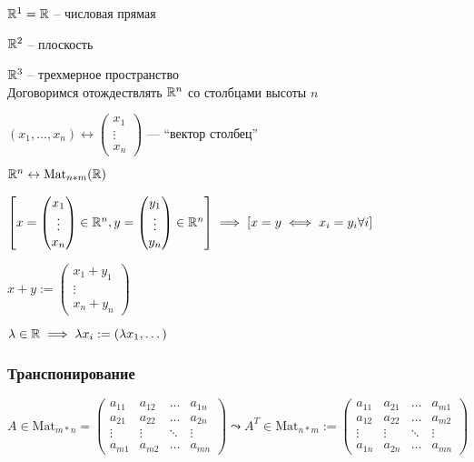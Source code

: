 \( \mathbb{R}^1 = \mathbb{R} \) \quad -- числовая прямая

\( \mathbb{R}^2 \) \quad -- плоскость

\( \mathbb{R}^3 \) \quad -- трехмерное пространство \\

Договоримся отождествлять \( \mathbb{R}^n \) со столбцами высоты \( n \)

\( (x_1, \dots, x_n) \leftrightarrow \left( \begin{smallmatrix}
	x_1 \\ \vdots \\ x_n
\end{smallmatrix} \right) \text{ --- ``вектор столбец''} \)

\( \mathbb{R}^n \leftrightarrow \text{Mat}_{n * m}(\mathbb{R}) \)

\( \left[ x = \begin{pmatrix}
	x_1 \\ \vdots \\ x_n
\end{pmatrix} \in \mathbb{R}^n, y = \begin{pmatrix}
	y_1 \\ \vdots \\ y_n
\end{pmatrix} \in \mathbb{R}^n \right] \implies \left[ x = y \iff x_i = y_i \forall i \right] \)

\( x + y := \begin{pmatrix}
	x_1 + y_1 \\ \vdots \\ x_n + y_n
\end{pmatrix} \)

\( \lambda \in \mathbb{R} \implies \lambda x_i := (\lambda x_1, \dots) \)

\subsubsection{Транспонирование}

\( A \in \text{Mat}_{m*n} = \begin{pmatrix}
	a_{11} & a_{12} & \dots & a_{1n} \\
	a_{21} & a_{22} & \dots & a_{2n} \\
	\vdots & \vdots & \ddots & \vdots \\
	a_{m1} & a_{m2} & \dots & a_{mn}
\end{pmatrix} \leadsto A^T \in \text{Mat}_{n*m} := \begin{pmatrix}
a_{11} & a_{21} & \dots & a_{m1} \\
a_{12} & a_{22} & \dots & a_{m2} \\
\vdots & \vdots & \ddots & \vdots \\
a_{1n} & a_{2n} & \dots & a_{mn}
\end{pmatrix} \)

